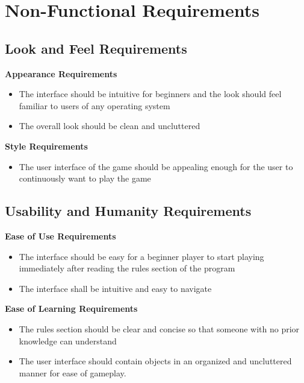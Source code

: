 \documentclass[12pt]{article}
\begin{document}
	\section{Non-Functional Requirements}
	\subsection{Look and Feel Requirements}
	\textbf{Appearance Requirements} 
	\begin{itemize}
	\item 	The interface should be intuitive for beginners and the look should feel 					familiar to users of any operating system
	\item	The overall look should be clean and uncluttered
	\end{itemize}
	
	\textbf{Style Requirements}
 	\begin{itemize}
 	\item 	The user interface of the game should be appealing enough for the user to 					continuously want to play the game
	\end{itemize}
	\subsection{Usability and Humanity Requirements}
	\textbf{Ease of Use Requirements}
	\begin{itemize}
	\item 	The interface should be easy for a beginner player to start playing immediately 			after reading the rules section of the program
	\item 	The interface shall be intuitive and easy to navigate 
	\end{itemize}
	\textbf{Ease of Learning Requirements}
	\begin{itemize}
	\item 	The rules section should be clear and concise so that someone with no prior 				knowledge can understand
	\item 	The user interface should contain objects in an organized and uncluttered 					manner for ease of gameplay.
	\end{itemize}
	
\end{document}
